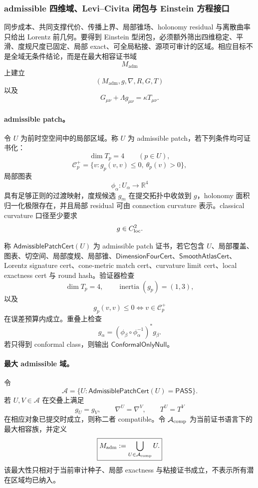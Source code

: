 \subsubsection{admissible 四维域、Levi--Civita 闭包与 Einstein 方程接口}\label{subsubsec:typed-address-biaxial-completion-admissible-four-dimensional-einstein-closure}
同步成本、共同支撑代价、传播上界、局部锥场、holonomy residual 与离散曲率只给出 Lorentz 前几何。要得到 Einstein 型闭包，必须额外筛出四维稳定、平滑、度规尺度已固定、局部 exact、可全局粘接、源项可审计的区域。相应目标不是全域无条件结论，而是在最大相容证书域
\[
M_{\mathrm{adm}}
\]
上建立
\[
(M_{\mathrm{adm}},g,\nabla,R,G,T)
\]
以及
\[
\boxed{
G_{\mu\nu}+\Lambda g_{\mu\nu}
=
\kappa T_{\mu\nu}.
}
\]

\paragraph{admissible patch。}
令 \(U\) 为前时空空间中的局部区域。称 \(U\) 为 admissible patch，若下列条件均可证书化：
\[
\dim T_p=4\qquad(p\in U),
\]
\[
\mathcal C_p^+=\{v:g_p(v,v)\le0,\ \theta_p(v)>0\},
\]
局部图表
\[
\phi_\alpha:U_\alpha\to\mathbb R^4
\]
具有足够正则的过渡映射，度规候选 \(g_m\) 在提交拓扑中收敛到 \(g\)，holonomy 面积归一化极限存在，并且局部 residual 可由 connection curvature 表示。classical curvature 口径至少要求
\[
g\in C^2_{\rm loc}.
\]

\begin{definition}\label{def:typed-address-biaxial-completion-admissible-patch-cert}
称 \(\mathsf{AdmissiblePatchCert}(U)\) 为 admissible patch 证书，若它包含 \(U\)、局部覆盖、图表、切空间、局部度规、局部锥、\(\mathsf{DimensionFourCert}\)、\(\mathsf{SmoothAtlasCert}\)、Lorentz signature cert、cone-metric match cert、curvature limit cert、local exactness cert 与 round hash。验证器检查
\[
\dim T_p=4,
\qquad
\operatorname{inertia}(g_p)=(1,3),
\]
以及
\[
g_p(v,v)\le0
\Longleftrightarrow
v\in\mathcal C_p^+
\]
在误差预算内成立。重叠上检查
\[
g_\alpha=(\phi_\beta\circ\phi_\alpha^{-1})^*g_\beta.
\]
若只得到 conformal class，则输出 \(\mathsf{ConformalOnlyNull}\)。
\end{definition}

\paragraph{最大 admissible 域。}
令
\[
\mathcal A=\{U:\mathsf{AdmissiblePatchCert}(U)=\mathsf{PASS}\}.
\]
若 \(U,V\in\mathcal A\) 在交叠上满足
\[
g_U=g_V,\qquad
\nabla^U=\nabla^V,
\qquad
T^U=T^V
\]
在相应对象已提交时成立，则称二者 compatible。令 \(\mathcal A_{\rm comp}\) 为当前证书语言下的最大相容族，并定义
\[
\boxed{
M_{\mathrm{adm}}
:=
\bigcup_{U\in\mathcal A_{\rm comp}}U.
}
\]
该最大性只相对于当前审计种子、局部 exactness 与粘接证书成立，不表示所有潜在区域均已纳入。


